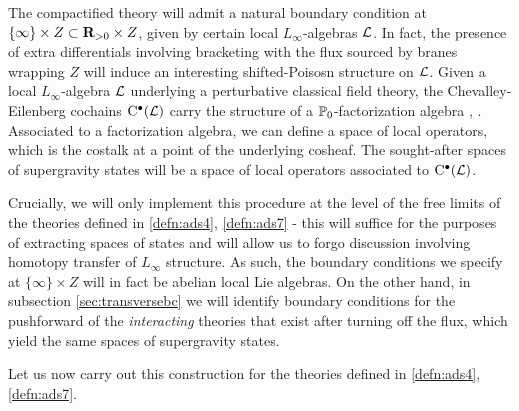 \documentclass[../main.tex]{subfiles}
\begin{document}
The compactified theory will admit a natural boundary condition at $\{\infty\}\times Z\subset \mathbf{R}_{>0}\times Z$, given by certain local $L_\infty$-algebras $\mathcal{L}$. In fact, the presence of extra differentials involving bracketing with the flux sourced by branes wrapping $Z$ will induce an interesting shifted-Poisosn structure on $\mathcal{L}$. Given a local $L_\infty$-algebra $\mathcal{L}$ underlying a perturbative classical field theory, the Chevalley-Eilenberg cochains ${\mathrm{C}}^\bullet (\mathcal{L})$ carry the structure of a $\mathbb{P}_0$-factorization algebra \cite{CG1}, \cite{CG2}. Associated to a factorization algebra, we can define a space of local operators, which is the costalk at a point of the underlying cosheaf. The sought-after spaces of supergravity states will be a space of local operators associated to ${\mathrm{C}}^\bullet (\mathcal{L})$. 

\begin{rmk}
Crucially, we will only implement this procedure at the level of the free limits of the theories defined in \ref{defn:ads4}, \ref{defn:ads7} - this will suffice for the purposes of extracting spaces of states and will allow us to forgo discussion involving homotopy transfer of $L_\infty$ structure. As such, the boundary conditions we specify at $\{\infty\}\times Z$ will in fact be abelian local Lie algebras. On the other hand, in subsection \ref{sec:transversebc} we will identify boundary conditions for the pushforward of the \textit{interacting} theories that exist after turning off the flux, which yield the same spaces of supergravity states. 
\end{rmk}

Let us now carry out this construction for the theories defined in \ref{defn:ads4}, \ref{defn:ads7}.



\end{document}
